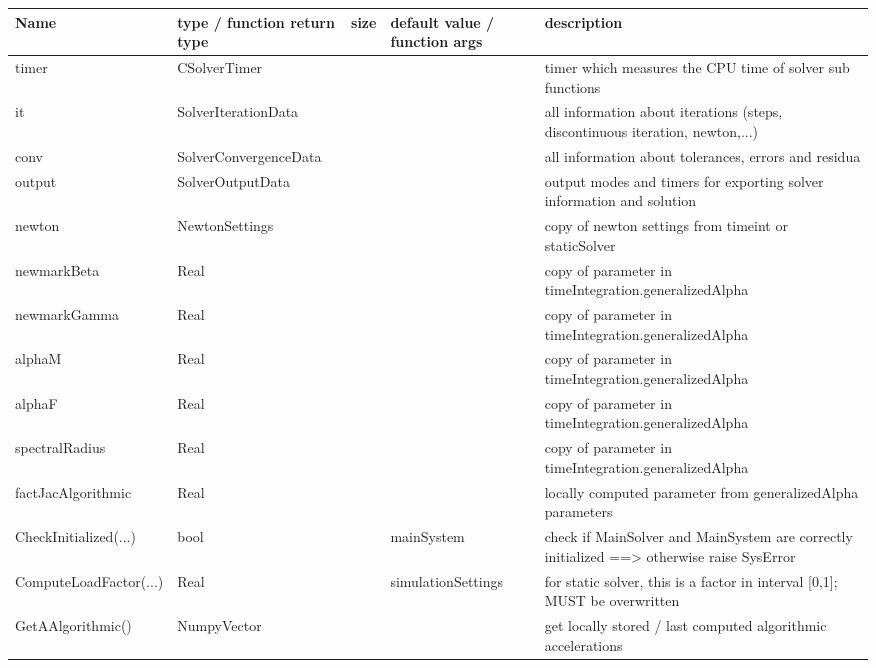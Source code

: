 \begin{center}
  \footnotesize
  \begin{longtable}{| p{4.2cm} | p{2.5cm} | p{0.3cm} | p{3.0cm} | p{6cm} |}
    \hline
    \bf Name & \bf type / function return type & \bf size & \bf default value / function args & \bf description \\ \hline
    timer &     CSolverTimer &      &      &     timer which measures the CPU time of solver sub functions\\ \hline
    it &     SolverIterationData &      &      &     all information about iterations (steps, discontinuous iteration, newton,...)\\ \hline
    conv &     SolverConvergenceData &      &      &     all information about tolerances, errors and residua\\ \hline
    output &     SolverOutputData &      &      &     output modes and timers for exporting solver information and solution\\ \hline
    newton &     NewtonSettings &      &      &     copy of newton settings from timeint or staticSolver\\ \hline
    newmarkBeta &     Real &      &      &     copy of parameter in timeIntegration.generalizedAlpha\\ \hline
    newmarkGamma &     Real &      &      &     copy of parameter in timeIntegration.generalizedAlpha\\ \hline
    alphaM &     Real &      &      &     copy of parameter in timeIntegration.generalizedAlpha\\ \hline
    alphaF &     Real &      &      &     copy of parameter in timeIntegration.generalizedAlpha\\ \hline
    spectralRadius &     Real &      &      &     copy of parameter in timeIntegration.generalizedAlpha\\ \hline
    factJacAlgorithmic &     Real &      &      &     locally computed parameter from generalizedAlpha parameters\\ \hline
    CheckInitialized(...) &     bool &      &     mainSystem &     check if MainSolver and MainSystem are correctly initialized ==> otherwise raise SysError\\ \hline
    ComputeLoadFactor(...) &     Real &      &     simulationSettings &     for static solver, this is a factor in interval [0,1]; MUST be overwritten\\ \hline
    GetAAlgorithmic() &     NumpyVector &      &      &     get locally stored / last computed algorithmic accelerations\\ \hline

\end{longtable}
\end{center}
